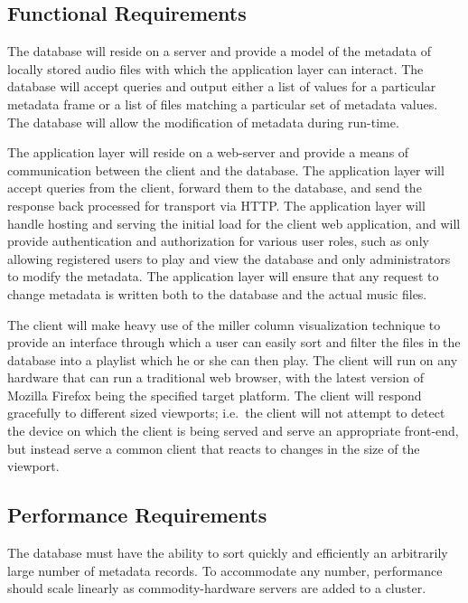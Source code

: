 \documentclass{abrice}
\begin{document}
\subsection{Functional Requirements}

The database will reside on a server and provide a model of the metadata of
locally stored audio files with which the application layer can interact. The
database will accept queries and output either a list of values for a particular
metadata frame or a list of files matching a particular set of metadata
values. The database will allow the modification of metadata during run-time.

The application layer will reside on a web-server and provide a means of
communication between the client and the database. The application layer will
accept queries from the client, forward them to the database, and send the
response back processed for transport via HTTP\@. The application layer will
handle hosting and serving the initial load for the client web application, and
will provide authentication and authorization for various user roles, such as
only allowing registered users to play and view the database and only
administrators to modify the metadata. The application layer will ensure that
any request to change metadata is written both to the database and the actual
music files.

The client will make heavy use of the miller column visualization technique to
provide an interface through which a user can easily sort and filter the files
in the database into a playlist which he or she can then play. The client will
run on any hardware that can run a traditional web browser, with the latest
version of Mozilla Firefox being the specified target platform. The client will
respond gracefully to different sized viewports; i.e.\ the client will not
attempt to detect the device on which the client is being served and serve an
appropriate front-end, but instead serve a common client that reacts to changes
in the size of the viewport.

\subsection{Performance Requirements}

The database must have the ability to sort quickly and efficiently an
arbitrarily large number of metadata records. To accommodate any number,
performance should scale linearly as commodity-hardware servers are added to a
cluster.
\end{document}
